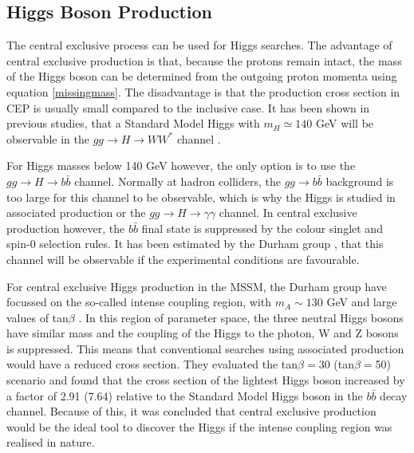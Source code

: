 \subsection{Higgs Boson Production}\label{cephiggs}

The central exclusive process can be used for Higgs searches. The advantage of central exclusive production is that, because the protons remain intact, the mass of the Higgs boson can be determined from the outgoing proton momenta using equation \ref{missingmass}. The disadvantage is that the production cross section in CEP is usually small compared to the inclusive case. It has been shown in previous studies, that a Standard Model Higgs with $m_H\simeq140$ GeV will be observable in the $gg \rightarrow H \rightarrow WW^{*}$ channel \cite{Cox:2005if}. 

For Higgs masses below 140 GeV however, the only option is to use the $gg \rightarrow H \rightarrow b\bar{b}$ channel. Normally at hadron colliders, the $gg \rightarrow b\bar{b}$ background is too large for this channel to be observable, which is why the Higgs is studied in associated production or the $gg \rightarrow H \rightarrow \gamma \gamma$ channel. In central exclusive production however, the $b\bar{b}$ final state is suppressed by the colour singlet and spin-0 selection rules. It has been estimated by the Durham group \cite{DeRoeck:2002hk}, that this channel will be observable if the experimental conditions are favourable. 

For central exclusive Higgs production in the MSSM, the Durham group have focussed on the so-called intense coupling region, with $m_A\sim 130$ GeV and large values of tan$\beta$ \cite{Kaidalov:2003ys}. In this region of parameter space, the three neutral Higgs bosons have similar mass and the coupling of the Higgs to the photon, W and Z bosons is suppressed. This means that conventional searches using associated production would have a reduced cross section. They evaluated the tan$\beta=$30 (tan$\beta=$50) scenario and found that the cross section of the lightest Higgs boson increased by a factor of 2.91 (7.64) relative to the Standard Model Higgs boson in the $b\bar{b}$ decay channel. Because of this, it was concluded that central exclusive production would be the ideal tool to discover the Higgs if the intense coupling region was realised in nature.






